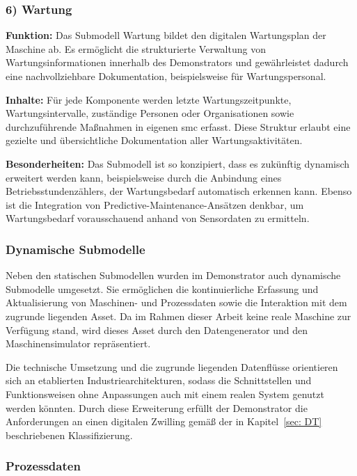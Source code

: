 \subsubsection*{6) Wartung}
\vspace{-0.5em}
\textbf{Funktion:}  
Das Submodell Wartung bildet den digitalen Wartungsplan der Maschine ab.  
Es ermöglicht die strukturierte Verwaltung von Wartungsinformationen innerhalb des Demonstrators und gewährleistet dadurch eine nachvollziehbare Dokumentation, beispielsweise für Wartungspersonal.

\textbf{Inhalte:}  
Für jede Komponente werden letzte Wartungszeitpunkte, Wartungsintervalle, zuständige Personen oder Organisationen sowie durchzuführende Maßnahmen in eigenen \acs{smc} erfasst.  
Diese Struktur erlaubt eine gezielte und übersichtliche Dokumentation aller Wartungsaktivitäten.

\textbf{Besonderheiten:}  
Das Submodell ist so konzipiert, dass es zukünftig dynamisch erweitert werden kann, beispielsweise durch die Anbindung eines Betriebsstundenzählers, der Wartungsbedarf automatisch erkennen kann.  
Ebenso ist die Integration von Predictive-Maintenance-Ansätzen denkbar, um Wartungsbedarf vorausschauend anhand von Sensordaten zu ermitteln.

\newpage
\subsubsection{Dynamische Submodelle}
\label{sec:DynamischeSubmodelle}
Neben den statischen Submodellen wurden im Demonstrator auch dynamische Submodelle umgesetzt.
Sie ermöglichen die kontinuierliche Erfassung und Aktualisierung von Maschinen- und Prozessdaten sowie die Interaktion mit dem zugrunde liegenden Asset.
Da im Rahmen dieser Arbeit keine reale Maschine zur Verfügung stand, wird dieses Asset durch den Datengenerator und den Maschinensimulator repräsentiert.

Die technische Umsetzung und die zugrunde liegenden Datenflüsse orientieren sich an etablierten Industriearchitekturen, sodass die Schnittstellen und Funktionsweisen ohne Anpassungen auch mit einem realen System genutzt werden könnten.
Durch diese Erweiterung erfüllt der Demonstrator die Anforderungen an einen digitalen Zwilling gemäß der in Kapitel~\ref{sec: DT} beschriebenen Klassifizierung.

\subsubsection*{Prozessdaten}

